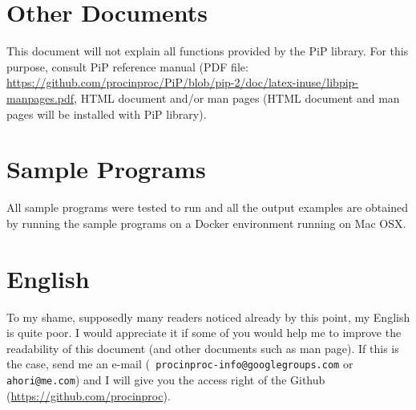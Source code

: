 \section*{Other Documents}

This document will not explain all functions provided by the PiP
library. For this purpose, consult PiP reference manual
(PDF file:
\url{https://github.com/procinproc/PiP/blob/pip-2/doc/latex-inuse/libpip-manpages.pdf}, HTML document and/or man pages (HTML document and man pages will be
installed with PiP library).

\section*{Sample Programs}

All sample programs were tested to run and all the output examples are
obtained by running the sample programs on a Docker environment
running on Mac OSX.

\section*{English}

To my shame, supposedly many readers noticed already by this point, my
English is quite poor. I would appreciate it if some of you would help
me to improve the readability of this document (and other documents
such as man page). If this is the case, send me an e-mail ({\tt
  procinproc-info@googlegroups.com} or {\tt ahori@me.com}) and I will 
give you the access right of the Github
(\url{https://github.com/procinproc}). 

